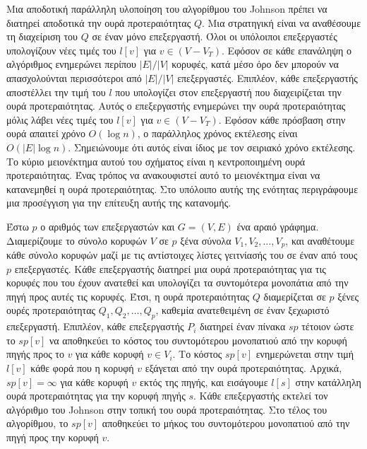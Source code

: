 \documentclass[12pt,a4paper]{article} %
\begin{document}
{{Μια αποδοτική παράλληλη υλοποίηση του αλγορίθμου του Johnson πρέπει να
διατηρεί αποδοτικά την ουρά προτεραιότητας $Q$. Μια στρατηγική είναι να
αναθέσουμε τη διαχείριση του $Q$ σε έναν μόνο επεξεργαστή. Όλοι οι
υπόλοιποι επεξεργαστές υπολογίζουν νέες τιμές του $l[v]$ για
$v \in (V - V_T)$. Εφόσον σε κάθε επανάληψη ο αλγόριθμος ενημερώνει
περίπου $|E|/|V|$ κορυφές, κατά μέσο όρο δεν μπορούν να απασχολούνται
περισσότεροι από $|E|/|V|$ επεξεργαστές. Επιπλέον, κάθε επεξεργαστής
αποστέλλει την τιμή του $l$ που υπολογίζει στον επεξεργαστή που διαχειρίζεται
την ουρά προτεραιότητας. Αυτός ο επεξεργαστής ενημερώνει την ουρά
προτεραιότητας μόλις λάβει νέες τιμές του $l[v]$ για $v \in (V - V_T)$.
Εφόσον κάθε πρόσβαση στην ουρά απαιτεί χρόνο $O(\log n)$, ο παράλληλος
χρόνος εκτέλεσης είναι $O(|E| \log n)$. Σημειώνουμε ότι αυτός είναι ίδιος
με τον σειριακό χρόνο εκτέλεσης. Το κύριο μειονέκτημα αυτού του σχήματος
είναι η κεντροποιημένη ουρά προτεραιότητας. Ένας τρόπος να ανακουφιστεί
αυτό το μειονέκτημα είναι να κατανεμηθεί η ουρά προτεραιότητας. Στο
υπόλοιπο αυτής της ενότητας περιγράφουμε μια προσέγγιση για την επίτευξη
αυτής της κατανομής.

Έστω $p$ ο αριθμός των επεξεργαστών και $G = (V, E)$ ένα αραιό γράφημα.
Διαμερίζουμε το σύνολο κορυφών $V$ σε $p$ ξένα σύνολα $V_1, V_2, \ldots,
V_p$, και αναθέτουμε κάθε σύνολο κορυφών μαζί με τις αντίστοιχες λίστες
γειτνίασής του σε έναν από τους $p$ επεξεργαστές. Κάθε επεξεργαστής
διατηρεί μια ουρά προτεραιότητας για τις κορυφές που του έχουν ανατεθεί
και υπολογίζει τα συντομότερα μονοπάτια από την πηγή προς αυτές τις
κορυφές. Έτσι, η ουρά προτεραιότητας $Q$ διαμερίζεται σε $p$ ξένες ουρές
προτεραιότητας $Q_1, Q_2, \ldots, Q_p$, καθεμία ανατεθειμένη σε έναν
ξεχωριστό επεξεργαστή. Επιπλέον, κάθε επεξεργαστής $P_i$ διατηρεί έναν
πίνακα $sp$ τέτοιον ώστε το $sp[v]$ να αποθηκεύει το κόστος του
συντομότερου μονοπατιού από την κορυφή πηγής προς το $v$ για κάθε κορυφή
$v \in V_i$. Το κόστος $sp[v]$ ενημερώνεται στην τιμή $l[v]$ κάθε φορά
που η κορυφή $v$ εξάγεται από την ουρά προτεραιότητας. Αρχικά,
$sp[v] = \infty$ για κάθε κορυφή $v$ εκτός της πηγής, και εισάγουμε
$l[s]$ στην κατάλληλη ουρά προτεραιότητας για την κορυφή πηγής $s$.
Κάθε επεξεργαστής εκτελεί τον αλγόριθμο του Johnson στην τοπική του
ουρά προτεραιότητας. Στο τέλος του αλγορίθμου, το $sp[v]$ αποθηκεύει
το μήκος του συντομότερου μονοπατιού από την πηγή προς την κορυφή $v$.

}}
\end{document}
